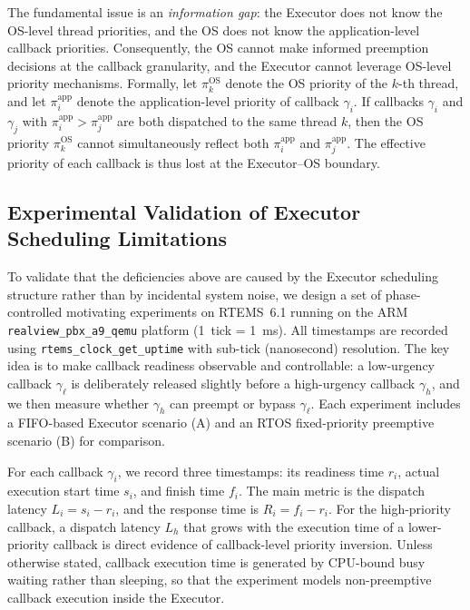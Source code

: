 The fundamental issue is an \emph{information gap}: the Executor does not know the OS-level thread priorities, and the OS does not know the application-level callback priorities.
Consequently, the OS cannot make informed preemption decisions at the callback granularity, and the Executor cannot leverage OS-level priority mechanisms.
Formally, let $\pi^{\text{OS}}_k$ denote the OS priority of the $k$-th thread, and let $\pi^{\text{app}}_i$ denote the application-level priority of callback $\gamma_i$.
If callbacks $\gamma_i$ and $\gamma_j$ with $\pi^{\text{app}}_i > \pi^{\text{app}}_j$ are both dispatched to the same thread $k$, then the OS priority $\pi^{\text{OS}}_k$ cannot simultaneously reflect both $\pi^{\text{app}}_i$ and $\pi^{\text{app}}_j$.
The effective priority of each callback is thus lost at the Executor--OS boundary.

\subsection{Experimental Validation of Executor Scheduling Limitations}

To validate that the deficiencies above are caused by the Executor scheduling structure rather than by incidental system noise, we design a set of phase-controlled motivating experiments on RTEMS~6.1 running on the ARM \texttt{realview\_pbx\_a9\_qemu} platform (1~tick = 1~ms). All timestamps are recorded using \texttt{rtems\_clock\_get\_uptime} with sub-tick (nanosecond) resolution. The key idea is to make callback readiness observable and controllable: a low-urgency callback $\gamma_\ell$ is deliberately released slightly before a high-urgency callback $\gamma_h$, and we then measure whether $\gamma_h$ can preempt or bypass $\gamma_\ell$. Each experiment includes a FIFO-based Executor scenario (A) and an RTOS fixed-priority preemptive scenario (B) for comparison.

For each callback $\gamma_i$, we record three timestamps: its readiness time $r_i$, actual execution start time $s_i$, and finish time $f_i$. The main metric is the dispatch latency $L_i=s_i-r_i$, and the response time is $R_i=f_i-r_i$. For the high-priority callback, a dispatch latency $L_h$ that grows with the execution time of a lower-priority callback is direct evidence of callback-level priority inversion. Unless otherwise stated, callback execution time is generated by CPU-bound busy waiting rather than sleeping, so that the experiment models non-preemptive callback execution inside the Executor.

